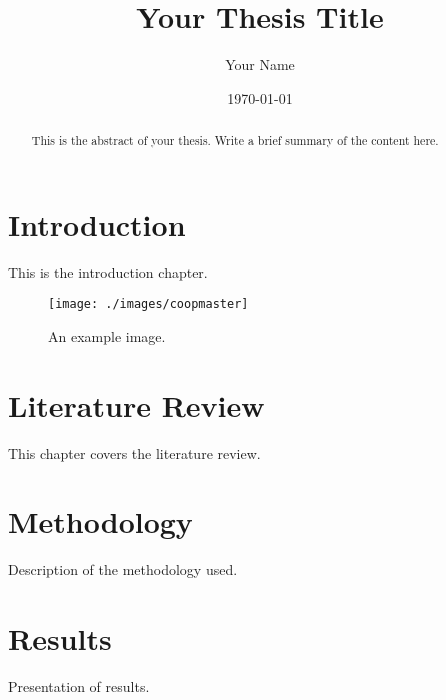 \documentclass[12pt, a4paper]{report}
\begin{document}
\title{Your Thesis Title}
\author{Your Name}
\date{\today}
\maketitle

\begin{abstract}
  This is the abstract of your thesis. Write a brief summary of the content here.
\end{abstract}

\tableofcontents

\printindex

\chapter{Introduction}
\label{chap:introduction}
This is the introduction chapter.

\begin{figure}[h!]
  \centering
  \texttt{[image: ./images/coopmaster]}
  \caption{An example image.}
  \label{fig:example}
\end{figure}

\chapter{Literature Review}
\label{chap:literature}
This chapter covers the literature review.


\chapter{Methodology}
\label{chap:methodology}
Description of the methodology used.

\chapter{Results}
\label{chap:results}
Presentation of results.


\end{document}
